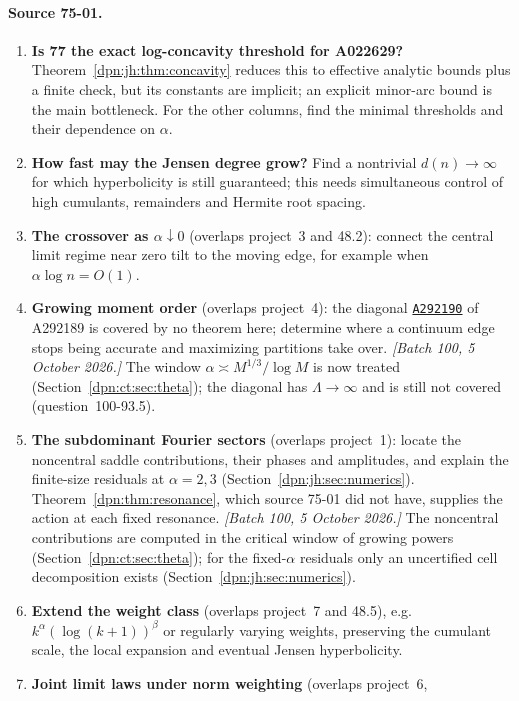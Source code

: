\documentclass[11pt]{article}
\numberwithin{equation}{section}
\theoremstyle{definition}\newtheorem{definition}[theorem]{Definition}
\theoremstyle{remark}\newtheorem{remark}[theorem]{Remark}
\newcommand{\OEIS}[1]{\href{https://oeis.org/#1}{\texttt{#1}}}
\begin{document}
\paragraph{Source 75-01.}
\begin{enumerate}[label=\textbf{75-01.\arabic*}, leftmargin=*]
\item \textbf{Is 77 the exact log-concavity threshold for A022629?}
  Theorem~\ref{dpn:jh:thm:concavity} reduces this to effective analytic bounds
  plus a finite check, but its constants are implicit; an explicit minor-arc
  bound is the main bottleneck.  For the other columns, find the minimal
  thresholds and their dependence on $\alpha$.
\item \textbf{How fast may the Jensen degree grow?}  Find a nontrivial
  $d(n)\to\infty$ for which hyperbolicity is still guaranteed; this needs
  simultaneous control of high cumulants, remainders and Hermite root spacing.
\item \textbf{The crossover as $\alpha\downarrow0$} (overlaps project~3 and
  48.2): connect the central limit regime near zero tilt to the moving edge,
  for example when $\alpha\log n=O(1)$.
\item \textbf{Growing moment order} (overlaps project~4): the diagonal
  \OEIS{A292190} of A292189 is covered by no theorem here; determine where a
  continuum edge stops being accurate and maximizing partitions take over.
  \textit{[Batch 100, 5 October 2026.]} The window
  $\alpha\asymp M^{1/3}/\log M$ is now treated (Section~\ref{dpn:ct:sec:theta});
  the diagonal has $\Lambda\to\infty$ and is still not covered
  (question~100-93.5).
\item \textbf{The subdominant Fourier sectors} (overlaps project~1): locate the
  noncentral saddle contributions, their phases and amplitudes, and explain
  the finite-size residuals at $\alpha=2,3$
  (Section~\ref{dpn:jh:sec:numerics}).  Theorem~\ref{dpn:thm:resonance}, which
  source 75-01 did not have, supplies the action at each fixed resonance.
  \textit{[Batch 100, 5 October 2026.]} The noncentral contributions are
  computed in the critical window of growing powers
  (Section~\ref{dpn:ct:sec:theta}); for the fixed-$\alpha$ residuals only an
  uncertified cell decomposition exists (Section~\ref{dpn:jh:sec:numerics}).
\item \textbf{Extend the weight class} (overlaps project~7 and 48.5), e.g.\
  $k^\alpha(\log(k+1))^\beta$ or regularly varying weights, preserving the
  cumulant scale, the local expansion and eventual Jensen hyperbolicity.
\item \textbf{Joint limit laws under norm weighting} (overlaps project~6,

\end{enumerate}
\end{document}
